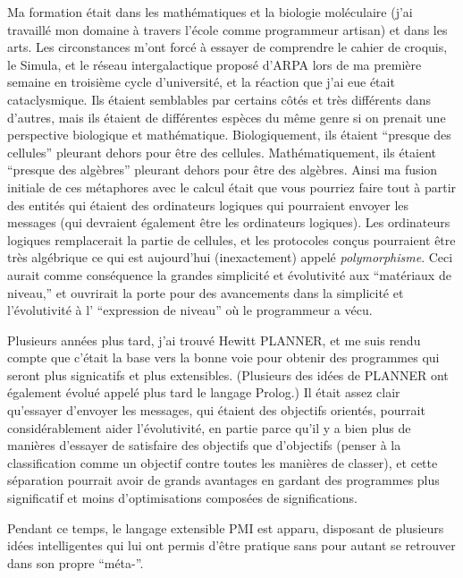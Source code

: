 \documentclass[a4paper,10pt,twoside]{book}
\begin{document}
Ma formation \'etait dans les math\'ematiques et la biologie mol\'eculaire (j'ai travaill\'e mon domaine \`a travers l'\'ecole comme programmeur artisan) et dans les arts. Les circonstances m'ont forc\'e \`a essayer de comprendre le cahier de croquis, le Simula, et le r\'eseau intergalactique propos\'e d'ARPA lors de ma premi\`ere semaine en troisi\`eme cycle d'universit\'e, et la r\'eaction que j'ai eue \'etait cataclysmique. Ils \'etaient semblables par certains c\^ot\'es et tr\`es diff\'erents dans d'autres, mais ils \'etaient de diff\'erentes esp\`eces du m\^eme genre si on prenait une perspective biologique et math\'ematique. Biologiquement, ils \'etaient ``presque des cellules'' pleurant dehors pour \^etre des cellules. Math\'ematiquement, ils \'etaient ``presque des alg\`ebres'' pleurant dehors pour \^etre des alg\`ebres. Ainsi ma fusion initiale de ces m\'etaphores avec le calcul \'etait que vous pourriez faire tout \`a partir des entit\'es qui \'etaient des ordinateurs logiques qui pourraient envoyer les messages (qui devraient \'egalement \^etre les ordinateurs logiques). Les ordinateurs logiques remplacerait la partie de cellules, et les protocoles con\c cus pourraient \^etre tr\`es alg\'ebrique ce qui est aujourd'hui (inexactement) appel\'e \emph{polymorphisme}. Ceci aurait comme cons\'equence la grandes simplicit\'e et \'evolutivit\'e aux ``mat\'eriaux de niveau,'' et ouvrirait la porte pour des avancements dans la simplicit\'e et l'\'evolutivit\'e \`a l' ``expression de niveau'' o\`u le programmeur a v\'ecu.


Plusieurs ann\'ees plus tard, j'ai trouv\'e Hewitt PLANNER, et me suis rendu compte que c'\'etait la base vers la bonne voie pour obtenir des programmes qui seront plus signicatifs et plus extensibles. (Plusieurs des id\'ees de PLANNER ont \'egalement \'evolu\'e appel\'e plus tard le langage Prolog.) Il \'etait assez clair qu'essayer d'envoyer les messages, qui \'etaient des objectifs orient\'es, pourrait consid\'erablement aider l'\'evolutivit\'e, en partie parce qu'il y a bien plus de mani\`eres d'essayer de satisfaire des objectifs que d'objectifs (penser \`a la classification comme un objectif contre toutes les mani\`eres de classer), et cette s\'eparation pourrait avoir de grands avantages en gardant des programmes plus significatif et moins d'optimisations compos\'ees de significations.


Pendant ce temps, le langage extensible PMI est apparu, disposant de plusieurs id\'ees intelligentes qui lui ont permis d'\^etre pratique sans pour autant se retrouver dans son propre ``m\'eta-''.
\end{document}
